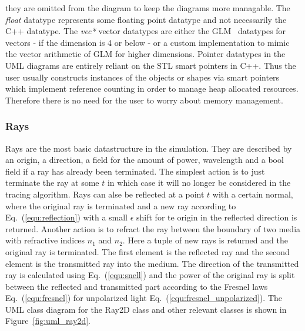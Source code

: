 \documentclass[a4paper,10pt]{article}
\newcommand{\equref}[1]{Eq.~(\ref{#1})}
\newcommand{\figref}[1]{Figure~\ref{#1}}
\begin{document}
    they are omitted from the diagram to keep the diagrams more
    managable.
    The \emph{float} datatype represents some floating point datatype
    and not necessarily the C++ datatype.
    The \emph{vec*} vector datatypes are either the GLM~\cite{glm} datatypes
    for vectors - if the dimension is 4 or below - or a custom implementation
    to mimic the vector arithmetic of GLM for higher dimensions.
    Pointer datatypes in the UML diagrams are entirely reliant on
    the STL smart pointers in C++.
    Thus the user usually constructs instances of the objects or shapes
    via smart pointers which implement reference counting
    in order to manage heap allocated resources.
    Therefore there is no need for the user to worry about 
    memory management. 

    \subsubsection{Rays}

    Rays are the most basic datastructure in the simulation.
    They are described by an origin, a direction, a field for the
    amount of power, wavelength and a bool field if a ray has
    already been terminated.
    The simplest action is to just terminate the ray at some $t$
    in which case it will no longer be considered in the tracing
    algorithm.
    Rays can alse be reflected at a point $t$ with a certain normal, 
    where the original ray is terminated and a new ray according to \equref{equ:reflection} with a small
    $\epsilon$ shift for te origin in the reflected direction is returned.
    Another action is to refract the ray between the boundary
    of two media with refractive indices $n_1$ and $n_2$.
    Here a tuple of new rays is returned and the original ray
    is terminated.
    The first element is the reflected ray and the second
    element is the transmitted ray into the medium.
    The direction of the transmitted ray is calculated using
    \equref{equ:snell} and the power of the original ray
    is split between the reflected and transmitted part according
    to the Fresnel laws \equref{equ:fresnel} for unpolarized
    light \equref{equ:fresnel_unpolarized}. 
    The UML class diagram for the Ray2D class and other relevant
    classes is shown in \figref{fig:uml_ray2d}.
\end{document}
